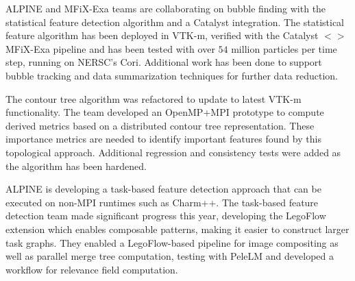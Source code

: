 ALPINE and MFiX-Exa teams are collaborating on bubble finding with the statistical feature detection algorithm and a Catalyst integration.  The statistical feature algorithm has been deployed in VTK-m, verified with the Catalyst $<>$ MFiX-Exa pipeline and has been tested with over $54$ million particles per time step, running on NERSC's Cori.  Additional work has been done to support bubble tracking and data summarization techniques for further data reduction.  



The contour tree algorithm was refactored to update to latest VTK-m functionality.   The team developed an OpenMP+MPI prototype to compute derived metrics based on a distributed contour tree representation.  These importance metrics are needed to identify important features found by this topological approach.  Additional regression and consistency tests were added as the algorithm has been hardened.  

ALPINE is developing a task-based feature detection approach that can be executed on non-MPI runtimes such as Charm++.  The task-based feature detection team made significant progress this year, developing the LegoFlow extension which enables composable patterns, making it easier to construct larger task graphs.   They enabled a LegoFlow-based pipeline for image compositing as well as parallel merge tree computation, testing with PeleLM and developed a workflow for relevance field computation.

